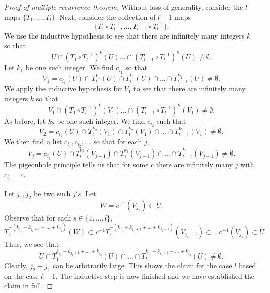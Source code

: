 \documentclass[12pt]{article}
\theoremstyle{definition}
\theoremstyle{remark}
\begin{document}
\begin{proof}[Proof of multiple recurrence theorem]
    Without loss of generality, consider the $l$ maps $\{T_1,\dots,T_{l}\}.$ Next, consider the collection of $l-1$ maps
    \[
    \{T_1\circ T^{-1}_{l},\dots,T_{l-1}\circ T^{-1}_{l}\}.
    \]
    We use the inductive hypothesis to see that there are infinitely many integers $k$ so that
    \[
    U\cap (T_1\circ T^{-1}_{l})^{k}(U)\dots\cap (T_{l-1}\circ T^{-1}_{l})^{k}(U)\neq\emptyset. 
    \]
    Let $k_1$ be one such integer. We find $c_{i_1}$ so that
    \[
    V_1=c_{i_1}(U)\cap T^{k_1}_{l}(U)\cap T^{k_1}_{1}(U)\cap\dots\cap T^{k_1}_{l-1}(U)\neq\emptyset.
    \]
    We apply the inductive hypothesis for $V_1$ to see that there are infinitely many integers $k$ so that
    \[
    V_1\cap (T_1\circ T^{-1}_{l})^{k}(V_1)\dots\cap (T_{l-1}\circ T^{-1}_{l})^{k}(V_1)\neq\emptyset.
    \]
    As before, let $k_2$ be one such integer. We find $c_{i_2}$ such that
    \[
    V_2=c_{i_2}(U)\cap T^{k_2}_{l}(V_1)\cap T^{k_2}_{1}(V_1)\cap\dots\cap T^{k_2}_{l-1}(V_1)\neq\emptyset.
    \]
    We then find a list $c_{i_1},c_{i_2},\dots$ so that for each $j$,
    \[
    V_j=c_{i_j}(U)\cap T^{k_j}_{l}(V_{j-1})\cap T^{k_j}_{1}(V_{j-1})\cap\dots\cap T^{k_j}_{l-1}(V_{j-1})\neq\emptyset.
    \]
    The pigeonhole principle tells us that for some $c$ there are infinitely many $j$ with $c_{i_j}=c.$

    Let $j_1,j_2$ be two such $j's$. Let
    \[
    W=c^{-1}(V_{j_2})\subset U.
    \]
    Observe that for each $s\in\{1,\dots,l\},$
    \[
    T^{-(k_{j_1}+k_{j_1+1}+\dots+k_{j_2})}_{s}(W)\subset c^{-1}T_s^{-(k_{j_1}+k_{j_1+1}+\dots+k_{j_2-1})}(V_{j_2-1})\subset \dots c^{-1}(V_{j_1})\subset U. 
    \]
    Thus, we see that
    \[
    U\cap T^{k_{j_1}+k_{j_1+1}+\dots+k_{j_2}}_1(U)\cap \dots \cap T^{k_{j_1}+k_{j_1+1}+\dots+k_{j_2}}_l(U)\neq\emptyset.
    \]
    Clearly, $j_2-j_1$ can be arbitrarily large. This shows the claim for the case $l$ based on the case $l-1$. The inductive step is now finished and we have established the claim in full.
\end{proof}

























\newpage
\end{document}

